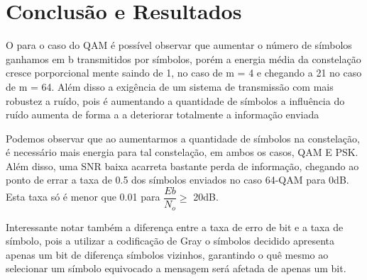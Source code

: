 \documentclass[a4paper, 12pt]{article}
\begin{document}





\clearpage

\clearpage

\clearpage

\clearpage

\clearpage

\section{Conclusão e Resultados}

O para o caso do QAM é possível observar que aumentar o número de símbolos ganhamos em b transmitidos por símbolos, porém a energia média da constelação cresce porporcional mente saindo de 1, no caso de m = 4 e chegando a 21 no caso de m = 64. Além disso a exigência de um sistema de transmissão com mais robustez a ruído, pois é aumentando a quantidade de símbolos a influência do ruído aumenta de forma a a deteriorar totalmente a informação enviada

Podemos observar que ao aumentarmos a quantidade de símbolos na constelação, é necessário mais energia para tal constelação, em ambos os casos, QAM E PSK. Além disso, uma SNR baixa acarreta bastante perda de informação, chegando ao ponto de errar a taxa de 0.5 dos símbolos enviados no caso 64-QAM para 0dB. Esta taxa só é menor que 0.01 para $\dfrac{Eb}{N_o} \geq $ 20dB.

Interessante notar também a diferença entre a taxa de erro de bit e a taxa de símbolo, pois a utilizar a codificação de Gray o símbolos decidido apresenta apenas um bit de diferença símbolos vizinhos, garantindo o quê mesmo ao selecionar um símbolo equivocado a mensagem será afetada de apenas um bit.

\clearpage

\printbibliography[heading=bibintoc]    %
\end{document}
